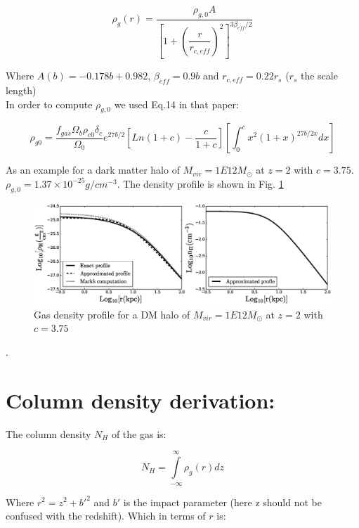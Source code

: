 \documentclass[12pt]{article}
\begin{document}
\begin{equation}\label{eq:rhogr}
\rho_g(r) =  \dfrac{\rho_{g,0}A}{\left[ 1 + \left(\dfrac{r}{r_{c,eff}}\right)^2 \right]^{3\beta_{eff}/2}}
\end{equation}

Where $A(b) = -0.178b + 0.982$, $\beta_{eff} = 0.9 b$ and $r_{c, eff}= 0.22 r_s$ ($r_s$ the scale length)\\

In order to compute $\rho_{g,0}$ we used Eq.14 in that paper:

\begin{equation}\label{eq:rhog0}
\rho_{g0} = \dfrac{f_{gas}\Omega_{b}\rho_{c0}\delta_{c}}{\Omega_0}e^{27b/2} \left [ Ln(1+c) - \dfrac{c}{1+c}  \right ] \left [ \int_0^c x^2(1+x)^{27b/2x} dx \right ]
\end{equation}

As an example for a dark matter halo of $M_{vir} = 1E12 M_{\odot}$ at
$z=2$ with $c=3.75$. $\rho_{g,0}=1.37\times10^{-25} g/cm^{-3}$. The
density profile is shown in Fig. \ref{fig:gp}

\begin{figure}
\centering
\includegraphics[scale=0.5]{../figures/gasprofile.eps}
\caption{Gas density profile for a DM halo of $M_{vir} = 1E12
M_{\odot}$ at $z=2$ with $c=3.75$ \label{fig:gp}}
\end{figure}.


\section{Column density derivation:}\label{sec:NH}

The column density $N_{H}$ of the gas is:

\begin{equation}
N_{H} = \int \limits_{-\infty}^{\infty}\rho_g(r)dz
\end{equation}

Where $r^2 = z^2 + b'^2$ and $b'$ is the impact parameter (here z
should not be confused with the redshift).
Which in terms of $r$ is:
\end{document}
